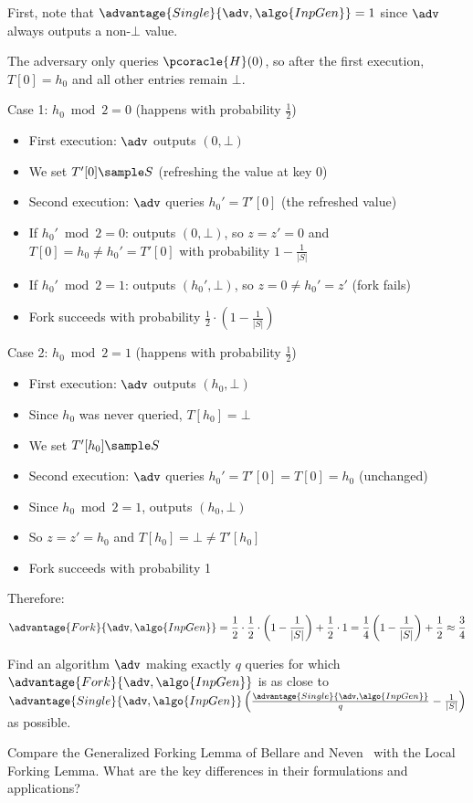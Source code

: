 \ifsolutions
\begin{mysolution}
  First, note that $\advantage{Single}{\adv, \algo{InpGen}} = 1$ since $\adv$ always outputs a non-$\bot$ value. 
  
  The adversary only queries $\pcoracle{H}(0)$, so after the first execution, $T[0] = h_0$ and all other entries remain $\bot$.
  
  Case 1: $h_0 \bmod 2 = 0$ (happens with probability $\frac{1}{2}$)
  \begin{itemize}
    \item First execution: $\adv$ outputs $(0, \bot)$
    \item We set $T'[0] \sample S$ (refreshing the value at key 0)
    \item Second execution: $\adv$ queries $h_0' = T'[0]$ (the refreshed value)
    \item If $h_0' \bmod 2 = 0$: outputs $(0, \bot)$, so $z = z' = 0$ and $T[0] = h_0 \neq h_0' = T'[0]$ with probability $1 - \frac{1}{|S|}$
    \item If $h_0' \bmod 2 = 1$: outputs $(h_0', \bot)$, so $z = 0 \neq h_0' = z'$ (fork fails)
    \item Fork succeeds with probability $\frac{1}{2} \cdot (1 - \frac{1}{|S|})$
  \end{itemize}
  
  Case 2: $h_0 \bmod 2 = 1$ (happens with probability $\frac{1}{2}$)
  \begin{itemize}
    \item First execution: $\adv$ outputs $(h_0, \bot)$
    \item Since $h_0$ was never queried, $T[h_0] = \bot$
    \item We set $T'[h_0] \sample S$
    \item Second execution: $\adv$ queries $h_0' = T'[0] = T[0] = h_0$ (unchanged)
    \item Since $h_0 \bmod 2 = 1$, outputs $(h_0, \bot)$
    \item So $z = z' = h_0$ and $T[h_0] = \bot \neq T'[h_0]$
    \item Fork succeeds with probability 1
  \end{itemize}
  
  Therefore:
  \[
  \advantage{Fork}{\adv, \algo{InpGen}} = \frac{1}{2} \cdot \frac{1}{2} \cdot \left(1 - \frac{1}{|S|}\right) + \frac{1}{2} \cdot 1 = \frac{1}{4} \left(1 - \frac{1}{|S|}\right) + \frac{1}{2} \approx \frac{3}{4}
  \]
\end{mysolution}
\fi

\begin{exercise}[Optional]
  Find an algorithm $\adv$ making exactly $q$ queries for which $\advantage{Fork}{\adv, \algo{InpGen}}$ is as close to $\advantage{Single}{\adv, \algo{InpGen}} \left( \frac{\advantage{Single}{\adv, \algo{InpGen}}}{q} - \frac{1}{|S|} \right)$ as possible.
\end{exercise}

\begin{exercise}[Optional]
  Compare the Generalized Forking Lemma of Bellare and Neven~\cite{CCS:BelNev06} with the Local Forking Lemma.
  What are the key differences in their formulations and applications?
\end{exercise}

